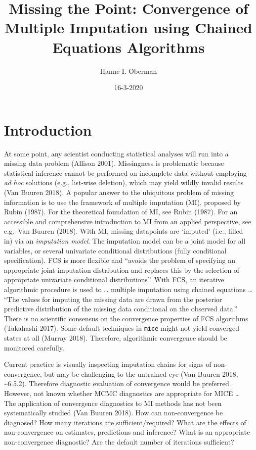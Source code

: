 \documentclass[
  Royal, times, sageapa]{sagej}
\title{Missing the Point: Convergence of Multiple Imputation using Chained
Equations Algorithms}
\author{Hanne I. Oberman}
\date{16-3-2020}
\begin{document}
\maketitle

\hypertarget{introduction}{%
\section{Introduction}\label{introduction}}

At some point, any scientist conducting statistical analyses will run
into a missing data problem (Allison 2001). Missingness is problematic
because statistical inference cannot be performed on incomplete data
without employing \emph{ad hoc} solutions (e.g., list-wise deletion),
which may yield wildly invalid results (Van Buuren 2018). A popular
answer to the ubiquitous problem of missing information is to use the
framework of multiple imputation (MI), proposed by Rubin (1987). For the
theoretical foundation of MI, see Rubin (1987). For an accessible and
comprehensive introduction to MI from an applied perspective, see
e.g.~Van Buuren (2018). With MI, missing datapoints are `imputed' (i.e.,
filled in) via an \emph{imputation model}. The imputation model can be a
joint model for all variables, or several univariate conditional
distributions (fully conditional specification). FCS is more flexible
and ``avoids the problem of specifying an appropriate joint imputation
distribution and replaces this by the selection of appropriate
univariate conditional distributions''. With FCS, an iterative
algorithmic procedure is used to \ldots{} multiple imputation using
chained equations \ldots{} ``The values for imputing the missing data
are drawn from the posterior predictive distribution of the missing data
conditional on the observed data.'' There is no scientific consensus on
the convergence properties of FCS algorithms (Takahashi 2017). Some
default techniques in \texttt{mice} might not yield converged states at
all (Murray 2018). Therefore, algorithmic convergence should be
monitored carefully.

Current practice is visually inspecting imputation chains for signs of
non-convergence, but may be challenging to the untrained eye (Van Buuren
2018, \textasciitilde6.5.2). Therefore diagnostic evaluation of
convergence would be preferred. However, not known whether MCMC
diagnostics are appropriate for MICE \ldots{} The application of
convergence diagnostics to MI methods has not been systematically
studied (Van Buuren 2018). How can non-convergence be diagnosed? How
many iterations are sufficient/required? What are the effects of
non-convergence on estimates, predictions and inference? What is an
appropriate non-convergence diagnostic? Are the default number of
iterations sufficient?
\end{document}
